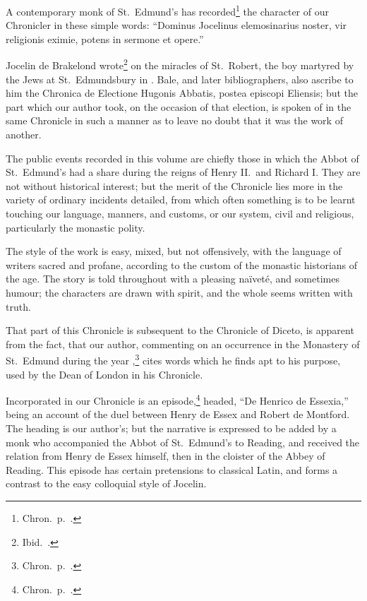 \documentclass[10pt]{book}
\begin{document}
{A contemporary monk of St.\ Edmund's has recorded\footnote{Chron.\ p.\ .} the character of our Chronicler in these simple words: ``Dominus Jocelinus elemosinarius noster, vir religionis eximie, potens in sermone et opere.''

Jocelin de Brakelond wrote\footnote{Ibid.\ .} on the miracles of St.\ Robert, the boy martyred by the Jews at St.\ Edmundsbury in . Bale, and later bibliographers, also ascribe to him the Chronica de Electione Hugonis Abbatis, postea episcopi Eliensis; but the part which our author took, on the occasion of that election, is spoken of in the same Chronicle in such a manner as to leave no doubt that it was the work of another.

The public events recorded in this volume are chiefly those in which the Abbot of St.\ Edmund's had a share during the reigns of Henry II.\ and Richard I. They are not without historical interest; but the merit of the Chronicle lies more in the variety of ordinary incidents detailed, from which often something is to be learnt touching our language, manners, and customs, or our system, civil and religious, particularly the monastic polity.

The style of the work is easy, mixed, but not offensively, with the language of writers sacred and profane, according to the custom of the monastic historians of the age. The story is told throughout with a pleasing naïveté, and sometimes humour; the characters are drawn with spirit, and the whole seems written with truth.

That part of this Chronicle is subsequent to the Chronicle of Diceto, is apparent from the fact, that our author,
commenting on an occurrence in the Monastery of St.\ Edmund during the year ,\footnote{Chron.\ p.\ .} cites words which he finds apt to his purpose, used by the Dean of London in his Chronicle.

Incorporated in our Chronicle is an episode,\footnote{Chron.\ p.\ .} headed, ``De Henrico de Essexia,'' being an account of the duel between Henry de Essex and Robert de Montford. The heading is our author's; but the narrative is expressed to be added by a monk who accompanied the Abbot of St.\ Edmund's to Reading, and received the relation from Henry de Essex himself, then in the cloister of the Abbey of Reading. This episode has certain pretensions to classical Latin, and forms a contrast to the easy colloquial style of Jocelin.

}
\end{document}
